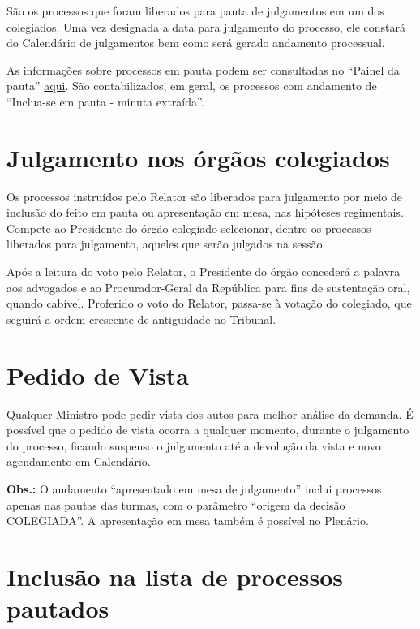\documentclass[
]{book}
\begin{document}
São os processos que foram liberados para pauta de julgamentos em um dos colegiados. Uma vez designada a data para julgamento do processo, ele constará do Calendário de julgamentos bem como será gerado andamento processual.

As informações sobre processos em pauta podem ser consultadas no ``Painel da pauta'' \href{https://transparencia.stf.jus.br/single/?appid=1dc722ab-891b-4ae9-9ee5-94f7800ac874\&sheet=191cc290-f75b-43d9-9957-37903c87cd90\&select=Orgao_Julgador,Plen\%C3\%A1rio}{aqui}.
São contabilizados, em geral, os processos com andamento de ``Inclua-se em pauta - minuta extraída''.

\hypertarget{julgamento-nos-uxf3rguxe3os-colegiados}{%
\section{Julgamento nos órgãos colegiados}\label{julgamento-nos-uxf3rguxe3os-colegiados}}

Os processos instruídos pelo Relator são liberados para julgamento por meio de inclusão do feito em pauta ou apresentação em mesa, nas hipóteses regimentais. Compete ao Presidente do órgão colegiado selecionar, dentre os processos liberados para julgamento, aqueles que serão julgados na sessão.

Após a leitura do voto pelo Relator, o Presidente do órgão concederá a palavra aos advogados e ao Procurador-Geral da República para fins de sustentação oral, quando cabível. Proferido o voto do Relator, passa-se à votação do colegiado, que seguirá a ordem crescente de antiguidade no Tribunal.

\hypertarget{pedido-de-vista}{%
\section{Pedido de Vista}\label{pedido-de-vista}}

Qualquer Ministro pode pedir vista dos autos para melhor análise da demanda. É possível que o pedido de vista ocorra a qualquer momento, durante o julgamento do processo, ficando suspenso o julgamento até a devolução da vista e novo agendamento em Calendário.

\textbf{Obs.:} O andamento ``apresentado em mesa de julgamento'' inclui processos apenas nas pautas das turmas, com o parâmetro ``origem da decisão COLEGIADA''. A apresentação em mesa também é possível no Plenário.

\hypertarget{inclusuxe3o-na-lista-de-processos-pautados}{%
\section{Inclusão na lista de processos pautados}\label{inclusuxe3o-na-lista-de-processos-pautados}}
\end{document}
